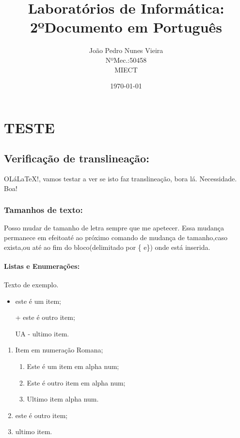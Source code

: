 \documentclass[12pt,openright,twoside]{report}
\title{\textbf{Laboratórios de Informática: \\2ºDocumento em Português}}
\author{João Pedro Nunes Vieira \\NºMec.:50458 \\MIECT}
\date{\today}
\begin{document}
\graphicspath{ {/home/jp/Desktop/LI/Imagens} }
\tableofcontents
\renewcommand{\partname}{Parte}
\renewcommand{\chaptername}{Tema}
\renewcommand{\contentsname}{Índice}

\chapter{TESTE}

\section{Verificação de translineação:}
OLá\LaTeX!, vamos testar a ver se isto faz translineação, bora lá. Necessidade. Boa!
\\
\subsection{Tamanhos de texto:}
Posso {\small mudar} de {\huge tamanho} de letra sempre que me apetecer. Essa \Large mudança permanece em efeito{\normalsize até} ao próximo comando de mudança de tamanho,caso exista,\normalsize\space ou até ao fim do bloco(delimitado por \{ e\}) onde está inserida.
\subsubsection{Listas e Enumerações:}
Texto de exemplo.

\begin{itemize}
\item este é um item;
\item[+] este é outro item;
\item[UA -] ultimo item.
\end{itemize}

\renewcommand{\theenumi}{\Roman{enumi}}
\begin{enumerate}
\item Item em numeração Romana;
	\renewcommand{\theenumi}{\alpha{enumi}}
	\begin{enumerate}
	\item Este é um item em alpha num;
	\item Este é outro item em alpha num;
	\item Ultimo item alpha num. 
	\end{enumerate}
\renewcommand{\theenumi}{\Roman{enumi}}
\item este é outro item;
\item ultimo item.
\end{enumerate}
\end{document}
